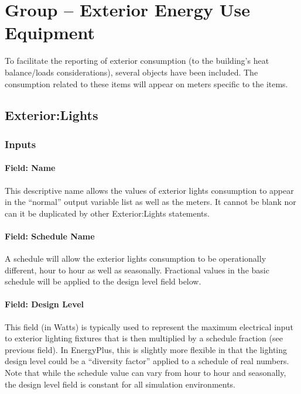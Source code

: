 \section{Group -- Exterior Energy Use Equipment}\label{group-exterior-energy-use-equipment}

To facilitate the reporting of exterior consumption (to the building's heat balance/loads considerations), several objects have been included. The consumption related to these items will appear on meters specific to the items.

\subsection{Exterior:Lights}\label{exteriorlights}

\subsubsection{Inputs}\label{inputs-017}

\paragraph{Field: Name}\label{field-name-016}

This descriptive name allows the values of exterior lights consumption to appear in the ``normal'' output variable list as well as the meters. It cannot be blank nor can it be duplicated by other Exterior:Lights statements.

\paragraph{Field: Schedule Name}\label{field-schedule-name-001}

A schedule will allow the exterior lights consumption to be operationally different, hour to hour as well as seasonally. Fractional values in the basic schedule will be applied to the design level field below.

\paragraph{Field: Design Level}\label{field-design-level}

This field (in Watts) is typically used to represent the maximum electrical input to exterior lighting fixtures that is then multiplied by a schedule fraction (see previous field). In EnergyPlus, this is slightly more flexible in that the lighting design level could be a ``diversity factor'' applied to a schedule of real numbers. Note that while the schedule value can vary from hour to hour and seasonally, the design level field is constant for all simulation environments.

